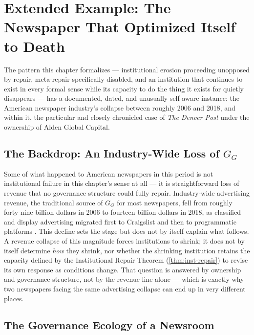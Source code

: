\documentclass[12pt,twoside,openright]{book}
\begin{document}
\section{Extended Example: The Newspaper That Optimized Itself to
Death}
\label{sec:ch28-newspaper}

The pattern this chapter formalizes --- institutional erosion
proceeding unopposed by repair, meta-repair specifically
disabled, and an institution that continues to exist in every
formal sense while its capacity to do the thing it exists for
quietly disappears --- has a documented, dated, and unusually
self-aware instance: the American newspaper industry's collapse
between roughly 2006 and 2018, and within it, the particular and
closely chronicled case of \emph{The Denver Post} under the
ownership of Alden Global Capital.

\subsection{The Backdrop: An Industry-Wide Loss of \texorpdfstring{$G_G$}{GG}}

Some of what happened to American newspapers in this period is
not institutional failure in this chapter's sense at all --- it
is straightforward loss of revenue that no governance structure
could fully repair. Industry-wide advertising revenue, the
traditional source of $G_G$ for most newspapers, fell from
roughly forty-nine billion dollars in 2006 to fourteen billion
dollars in 2018, as classified and display advertising migrated
first to Craigslist and then to programmatic platforms
\parencite{pew2019newspapers}. This decline sets the stage but
does not by itself explain what follows. A revenue collapse of
this magnitude forces institutions to shrink; it does not by
itself determine \emph{how} they shrink, nor whether the
shrinking institution retains the capacity defined by the
Institutional Repair Theorem (\cref{thm:inst-repair}) to revise
its own response as conditions change. That question is
answered by ownership and governance structure, not by the
revenue line alone --- which is exactly why two newspapers
facing the same advertising collapse can end up in very
different places.

\subsection{The Governance Ecology of a Newsroom}
\end{document}

